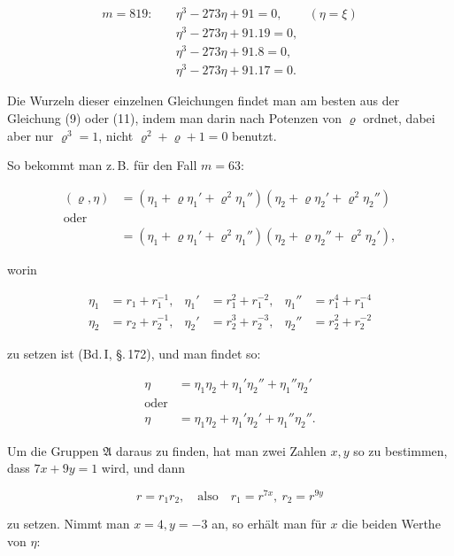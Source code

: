\[ \begin{aligned}
m = 819:\quad &\eta^3 - 273\eta + 91 = 0, & (\eta = \xi) \\
&\eta^3 - 273\eta + 91 . 19 = 0, \\
&\eta^3 - 273\eta + 91 . 8 = 0, \\
&\eta^3 - 273\eta + 91 . 17 = 0.
\end{aligned} \]

Die Wurzeln dieser einzelnen Gleichungen findet man am besten aus der
Gleichung (9) oder (11), indem man darin nach Potenzen von $\varrho$
ordnet, dabei aber nur $\varrho^3 = 1$, nicht $\varrho^2 + \varrho + 1 = 0$
benutzt.

So bekommt man z.\,B. für den Fall $m = 63$:

\[ \begin{aligned}
(\varrho, \eta) &= (\eta_1 + \varrho\eta_1' + \varrho^2\eta_1'')(\eta_2 + \varrho\eta_2' + \varrho^2\eta_2'') \\
\text{oder} \\
&= (\eta_1 + \varrho\eta_1' + \varrho^2\eta_1'')(\eta_2 + \varrho\eta_2'' + \varrho^2\eta_2'),
\end{aligned} \]

worin

\[ \begin{aligned}
\eta_1 &= r_1 + r_1^{-1}, & \eta_1' &= r_1^2 + r_1^{-2}, & \eta_1'' &= r_1^4 + r_1^{-4} \\
\eta_2 &= r_2 + r_2^{-1}, & \eta_2' &= r_2^3 + r_2^{-3}, & \eta_2'' &= r_2^2 + r_2^{-2}
\end{aligned} \]

zu setzen ist (Bd.\,I, \S.\,172), und man findet so:

\[ \begin{aligned}
\eta &= \eta_1\eta_2 + \eta_1'\eta_2'' + \eta_1''\eta_2' \\
\text{oder} \\
\eta &= \eta_1\eta_2 + \eta_1'\eta_2' + \eta_1''\eta_2''.
\end{aligned} \]

Um die Gruppen $\mathfrak{A}$ daraus zu finden, hat man zwei Zahlen $x, y$
so zu bestimmen, dass $7x + 9y = 1$ wird, und dann

\[ r = r_1 r_2, \quad \text{also} \quad r_1 = r^{7x}, \ r_2 = r^{9y} \]

zu setzen. Nimmt man $x = 4, y = -3$ an, so erhält man für $x$ die beiden %
Werthe von $\eta$:

